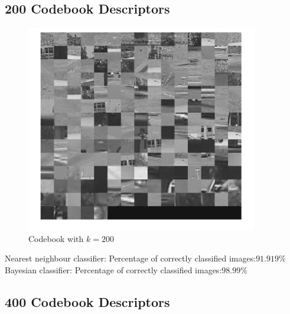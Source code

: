 \documentclass[12pt]{article}
\begin{document}
\subsection{200 Codebook Descriptors}

\vspace{5mm}
\begin{figure}[H]
	\centering
	\includegraphics[width=0.9\textwidth]{k200.jpg}
	\caption{Codebook with $k=200$}
	\label{fig1}
\end{figure}
\vspace{5mm}
Nearest neighbour classifier: 
\newline
Percentage of correctly classified images:$91.919\%$
\vspace{5mm}
\newline
Bayesian classifier: 
\newline
Percentage of correctly classified images:$98.99\%$

\subsection{400 Codebook Descriptors}
\end{document}
